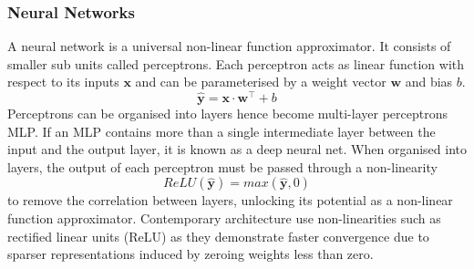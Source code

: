 \subsubsection{Neural Networks}
A neural network is a universal non-linear function approximator. It
consists of smaller sub units called perceptrons. Each perceptron acts as linear
function with respect to its inputs $\mathbf{x}$ and can be parameterised by a weight
vector $\mathbf{w}$ and bias $b$.
\begin{equation}
    \mathbf{\hat{y}} =\mathbf{x} \cdot \mathbf{w}^\top + b
\end{equation}
Perceptrons can be organised into layers hence become multi-layer perceptrons MLP.
If an MLP contains more than a single intermediate layer between the input and the output
layer, it is known as a deep neural net. When organised into layers, the output
of each perceptron must be passed through a non-linearity \[ReLU(\mathbf{\hat{y}}) = max (\mathbf{\hat{y}},0)\] to remove the correlation between
layers, unlocking its potential as a non-linear function approximator.
Contemporary architecture use non-linearities such as rectified linear units (ReLU)
as they demonstrate faster convergence due to sparser representations induced by zeroing weights less than zero.
